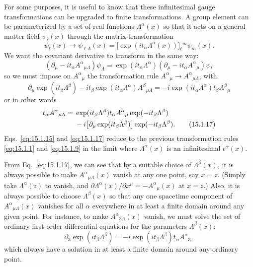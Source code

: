 For some purposes, it is useful to know that these infinitesimal gauge
transformations can be upgraded to finite transformations. A group element can
be parameterized by a set of real functions $\Lambda^\alpha(x)$ so that it acts
on a general matter field $\psi_\ell(x)$ through the matrix transformation
\begin{equation}
 \psi_\ell(x)\longrightarrow\psi_{\ell\Lambda}(x)
 =\bigl[\exp(it_\alpha\Lambda^\alpha(x))\bigr]_\ell{}^m\psi_m(x) .
 \tag{15.1.15}\label{eq:15.1.15}
\end{equation}
We want the covariant derivative to transform in the same way:
\begin{equation}
 (\partial_\mu-it_\alpha A^\alpha{}_{\mu\Lambda})\psi_\Lambda
 =\exp(it_\alpha\Lambda^\alpha)(\partial_\mu-it_\alpha A^\alpha{}_\mu)\psi ,
 \tag{15.1.16}\label{eq:15.1.16}
\end{equation}
so we must impose on $A^\alpha{}_\mu$ the transformation rule
$A^\alpha{}_\mu\longrightarrow A^\alpha{}_{\mu\Lambda}$, with
\[
 \partial_\mu\exp(it_\beta\Lambda^\beta)
 -it_\beta\exp(it_\alpha\Lambda^\alpha)A^\beta{}_{\mu\Lambda}
 =-i\exp(it_\alpha\Lambda^\alpha)t_\beta A^\beta{}_\mu
\]
or in other words
\begin{align}
 t_\alpha A^\alpha{}_{\mu\Lambda}={}&
 \exp(it_\beta\Lambda^\beta)t_\alpha A^\alpha{}_\mu
 \exp(-it_\beta\Lambda^\beta)\notag\\
 &{}-i\bigl[\partial_\mu\exp(it_\beta\Lambda^\beta)\bigr]
 \exp(-it_\beta\Lambda^\beta) .
 \tag{15.1.17}\label{eq:15.1.17}
\end{align}
Eqs.~\eqref{eq:15.1.15} and \eqref{eq:15.1.17} reduce to the previous
transformation rules \eqref{eq:15.1.1} and \eqref{eq:15.1.9} in the limit where
$\Lambda^\alpha(x)$ is an infinitesimal $\epsilon^\alpha(x)$.

From Eq.~\eqref{eq:15.1.17}, we can see that by a suitable choice of
$\Lambda^\beta(x)$, it is always possible to make $A^\alpha{}_{\mu\Lambda}(x)$
vanish at any one point, say $x=z$. (Simply take $\Lambda^\alpha(z)$ to vanish,
and $\partial\Lambda^\alpha(x)/\partial x^\mu=-A^\alpha{}_\mu(x)$ at $x=z$.)
Also, it is always possible to choose $\Lambda^\beta(x)$ so that any one
spacetime component of $A^\alpha{}_{\mu\Lambda}(x)$ vanishes for all $\alpha$
everywhere in at least a finite domain around any given point. For instance, to
make $A^\alpha{}_{3\Lambda}(x)$ vanish, we must solve the set of ordinary
first-order differential equations for the parameters $\Lambda^\beta(x)$:
\begin{equation}
 \partial_3\exp(it_\beta\Lambda^\beta)
 =-i\exp(it_\beta\Lambda^\beta)t_\alpha A^\alpha{}_3 ,
 \tag{15.1.18}\label{eq:15.1.18}
\end{equation}
which always have a solution in at least a finite domain around any ordinary
point.


